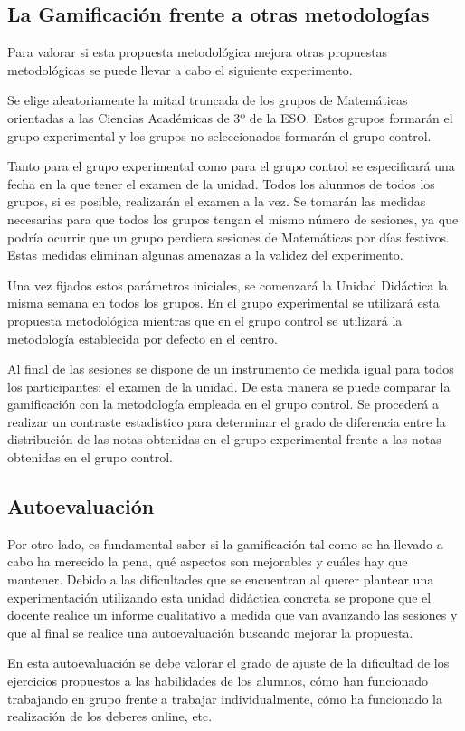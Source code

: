 \label{evalGami}

\subsection{La Gamificación frente a otras metodologías}

Para valorar si esta propuesta metodológica mejora otras propuestas metodológicas se puede llevar a cabo el siguiente experimento.

Se elige aleatoriamente la mitad truncada de los grupos de Matemáticas orientadas a las Ciencias Académicas de 3º de la ESO.
%
Estos grupos formarán el grupo experimental y los grupos no seleccionados formarán el grupo control.

Tanto para el grupo experimental como para el grupo control se especificará una fecha en la que tener el examen de la unidad.
%
Todos los alumnos de todos los grupos, si es posible, realizarán el examen a la vez.
%
Se tomarán las medidas necesarias para que todos los grupos tengan el mismo número de sesiones, ya que podría ocurrir que un grupo perdiera sesiones de Matemáticas por días festivos.
%
Estas medidas eliminan algunas amenazas a la validez del experimento.

Una vez fijados estos parámetros iniciales, se comenzará la Unidad Didáctica la misma semana en todos los grupos.
%
En el grupo experimental se utilizará esta propuesta metodológica mientras que en el grupo control se utilizará la metodología establecida por defecto en el centro.

Al final de las sesiones se dispone de un instrumento de medida igual para todos los participantes: el examen de la unidad.
%
De esta manera se puede comparar la gamificación con la metodología empleada en el grupo control.
%
Se procederá a realizar un contraste estadístico para determinar el grado de diferencia entre la distribución de las notas obtenidas en el grupo experimental frente a las notas obtenidas en el grupo control.


\subsection{Autoevaluación}

Por otro lado, es fundamental saber si la gamificación tal como se ha llevado a cabo ha merecido la pena, qué aspectos son mejorables y cuáles hay que mantener.
%
Debido a las dificultades que se encuentran al querer plantear una experimentación utilizando esta unidad didáctica concreta se propone que el docente realice un informe cualitativo a medida que van avanzando las sesiones y que al final se realice una autoevaluación buscando mejorar la propuesta.

En esta autoevaluación se debe valorar el grado de ajuste de la dificultad de los ejercicios propuestos a las habilidades de los alumnos, 
%
cómo han funcionado trabajando en grupo frente a trabajar individualmente, cómo ha funcionado la realización de los deberes online, etc.

